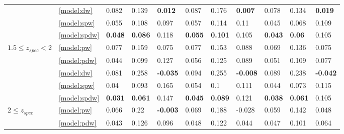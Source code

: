\documentclass[fleqn,usenatbib]{mnras}
\begin{document}
\begin{table}
\begin{tabular}{lllllllllll}
                                   & \ref{model:dw} &                0.082 &           0.139 &   \textbf{0.012} &            0.087 &           0.176 &   \textbf{0.007} &            0.078 &           0.134 &   \textbf{0.019} \\
                                   & \ref{model:spw} &                0.055 &           0.108 &            0.097 &            0.057 &           0.114 &             0.11 &            0.045 &           0.068 &            0.109 \\
                                   & \ref{model:spdw} &       \textbf{0.048} &  \textbf{0.086} &            0.118 &   \textbf{0.055} &  \textbf{0.101} &            0.105 &   \textbf{0.043} &   \textbf{0.06} &            0.105 \\
\hline
            $1.5 \leq z_{spec} < 2$ & \ref{model:pw} &                0.077 &           0.159 &            0.075 &            0.077 &           0.153 &            0.088 &            0.069 &           0.136 &            0.075 \\
                                   & \ref{model:pdw} &                0.044 &           0.099 &            0.127 &            0.056 &           0.125 &            0.089 &            0.051 &           0.109 &            0.077 \\
                                   & \ref{model:dw} &                0.081 &           0.258 &  \textbf{-0.035} &            0.094 &           0.255 &  \textbf{-0.008} &            0.089 &           0.238 &  \textbf{-0.042} \\
                                   & \ref{model:spw} &                 0.04 &           0.093 &            0.165 &            0.054 &             0.1 &            0.111 &            0.044 &           0.073 &            0.115 \\
                                   & \ref{model:spdw} &       \textbf{0.031} &  \textbf{0.061} &            0.147 &   \textbf{0.045} &  \textbf{0.089} &            0.121 &   \textbf{0.038} &  \textbf{0.061} &            0.105 \\
\hline
            $2 \leq z_{spec}$ & \ref{model:pw} &                0.066 &            0.22 &  \textbf{-0.003} &            0.069 &           0.188 &           -0.028 &            0.059 &           0.142 &            0.048 \\
                                   & \ref{model:pdw} &                0.043 &           0.126 &            0.096 &            0.048 &           0.122 &            0.044 &            0.047 &           0.101 &            0.064 \\

\end{tabular}
\end{table}
\end{document}
